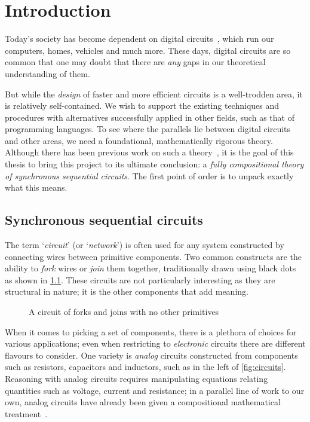 \chapter{Introduction}


Today's society has become dependent on digital
circuits~\cite{katz2005contemporary}, which run our computers, homes, vehicles
and much more.
These days, digital circuits are so common that one may doubt that there are
\emph{any} gaps in our theoretical understanding of them.

But while the \emph{design} of faster and more efficient circuits is a
well-trodden area, it is relatively self-contained.
We wish to support the existing techniques and procedures with alternatives
successfully applied in other fields, such as that of programming languages.
To see where the parallels lie between digital circuits and other areas,
we need a foundational, mathematically rigorous theory.
Although there has been previous work on such a
theory~\cite{lafont2003algebraic,ghica2017diagrammatic,ghica2018structural}, it
is the goal of this thesis to bring this project to its ultimate conclusion:
a \emph{fully compositional theory of synchronous sequential circuits}.
The first point of order is to unpack exactly what this means.

\section{Synchronous sequential circuits}

The term `\emph{circuit}' (or `\emph{network}')
is often used for any system constructed by connecting wires between primitive
components.
Two common constructs are the ability to \emph{fork} wires or \emph{join} them
together, traditionally drawn using black dots as shown in \cref{fig:forkjoin}.
These circuits are not particularly interesting as they are structural in
nature; it is the other components that add meaning.

\begin{figure}
    \centering
    \caption{
        A circuit of forks and joins with no other primitives
    }
    \label{fig:forkjoin}
\end{figure}

When it comes to picking a set of components, there is a plethora of choices
for various applications; even when restricting to \emph{electronic} circuits
there are different flavours to consider.
One variety is \emph{analog} circuits  constructed from
components such as resistors, capacitors and inductors, such as in the left of
\cref{fig:circuits}.
Reasoning with analog circuits requires manipulating equations relating
quantities such as voltage, current and resistance; in a parallel line of work
to our own, analog circuits have already been given a compositional mathematical
treatment~\cite{boisseau2022string}.

